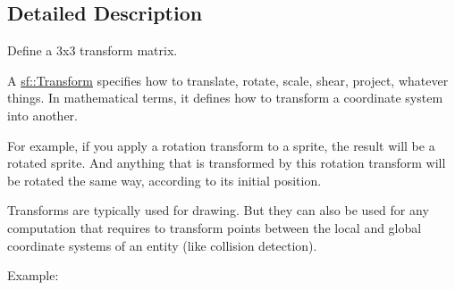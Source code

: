 \subsection{Detailed Description}
Define a 3x3 transform matrix. 

\begin{DoxyVerb}\end{DoxyVerb}


A \mbox{\hyperlink{classsf_1_1_transform}{sf\+::\+Transform}} specifies how to translate, rotate, scale, shear, project, whatever things. In mathematical terms, it defines how to transform a coordinate system into another.

For example, if you apply a rotation transform to a sprite, the result will be a rotated sprite. And anything that is transformed by this rotation transform will be rotated the same way, according to its initial position.

Transforms are typically used for drawing. But they can also be used for any computation that requires to transform points between the local and global coordinate systems of an entity (like collision detection).

Example\+: 
\begin{DoxyCode}{0}
\DoxyCodeLine{\textcolor{comment}{// define a translation transform}}
\DoxyCodeLine{}
\DoxyCodeLine{\textcolor{comment}{// define a rotation transform}}
\DoxyCodeLine{}
\DoxyCodeLine{\textcolor{comment}{// combine them}}
\DoxyCodeLine{}
\DoxyCodeLine{\textcolor{comment}{// use the result to transform stuff...}}
\end{DoxyCode}



